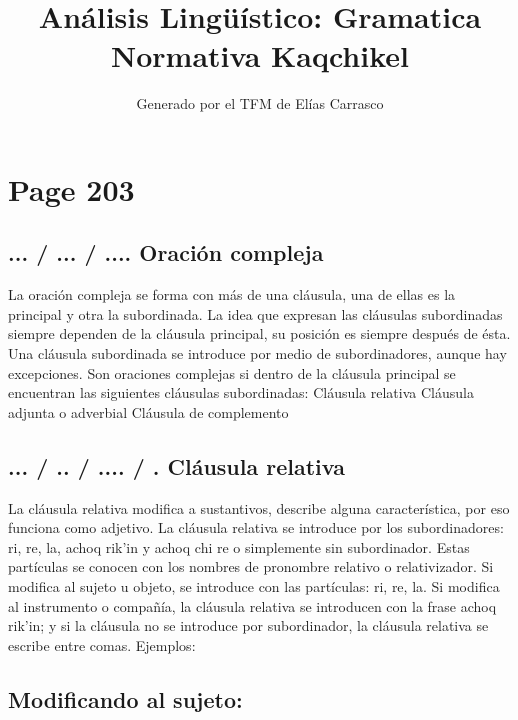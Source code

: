 \documentclass{article}%
\title{Análisis Lingüístico: Gramatica Normativa Kaqchikel}%
\author{Generado por el TFM de Elías Carrasco}%
\begin{document}
%
\normalsize%
\maketitle%
\section{Page 203}%
\label{sec:Page203}%
\subsection{... / ... / .... Oración compleja}%
\label{subsec:.../.../....Oracincompleja}%

%
La oración compleja se forma con más de una cláusula, una de ellas es la principal y %
otra la subordinada. La idea que expresan las cláusulas subordinadas siempre dependen %
de la cláusula principal, su posición es siempre después de ésta. Una cláusula subordinada %
se introduce por medio de subordinadores, aunque hay excepciones. Son oraciones %
complejas si dentro de la cláusula principal se encuentran las siguientes cláusulas %
subordinadas: %
Cláusula relativa %
Cláusula adjunta o adverbial %
Cláusula de complemento %
\subsection{... / .. / .... / . Cláusula relativa}%
\label{subsec:.../../..../.Clusularelativa}%

%
La cláusula relativa modifica a sustantivos, describe alguna característica, por eso %
funciona como adjetivo. La cláusula relativa se introduce por los subordinadores: ri, %
re, la, achoq rik'in y achoq chi re o simplemente sin subordinador. Estas partículas se %
conocen con los nombres de pronombre relativo o relativizador. Si modifica al sujeto u %
objeto, se introduce con las partículas: ri, re, la. Si modifica al instrumento o compañía, %
la cláusula relativa se introducen con la frase achoq rik'in; y si la cláusula no se %
introduce por subordinador, la cláusula relativa se escribe entre comas. Ejemplos: %
\subsection{Modificando al sujeto:}%
\label{subsec:Modificandoalsujeto}%
\end{document}
